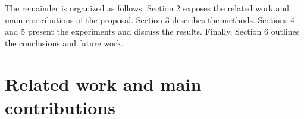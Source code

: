 \documentclass[journal]{IEEEtran}
\begin{document}
The remainder is organized as follows. Section 2 exposes the related work and main contributions of the proposal. Section 3 describes the methods. Sections 4 and 5 present the experiments and discuss the results. Finally, Section 6 outlines the conclusions and future work.

\section{Related work and main contributions}


\end{document}
